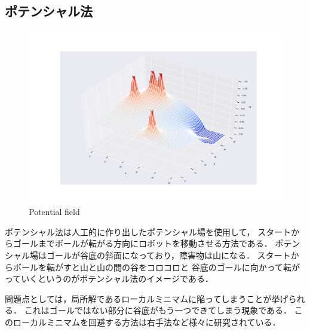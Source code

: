 
\subsection{ポテンシャル法}

\begin{figure}[H]
  \centering
 \includegraphics[keepaspectratio, scale=0.4]
      {images/png/potential.png}
 \caption{Potential field ~\cite{pathpt1:online}}
 \label{Fig:potential}
\end{figure}

ポテンシャル法は人工的に作り出したポテンシャル場を使用して，
スタートからゴールまでボールが転がる方向にロボットを移動させる方法である．
ポテンシャル場はゴールが谷底の斜面になっており，障害物は山になる．
スタートからボールを転がすと山と山の間の谷をコロコロと
谷底のゴールに向かって転がっていくというのがポテンシャル法のイメージである．

問題点としては，局所解であるローカルミニマムに陥ってしまうことが挙げられる．
これはゴールではない部分に谷底がもう一つできてしまう現象である．
このローカルミニマムを回避する方法は右手法など様々に研究されている．


\newpage
